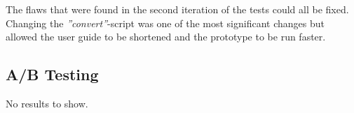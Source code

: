 The flaws that were found in the second iteration of the tests could all be fixed. Changing the \textit{''convert''}-script was one of the most significant changes but allowed the user guide to be shortened and the prototype to be run faster.


\subsection{A/B Testing}%
\label{sub:A/B Testing}

No results to show.


